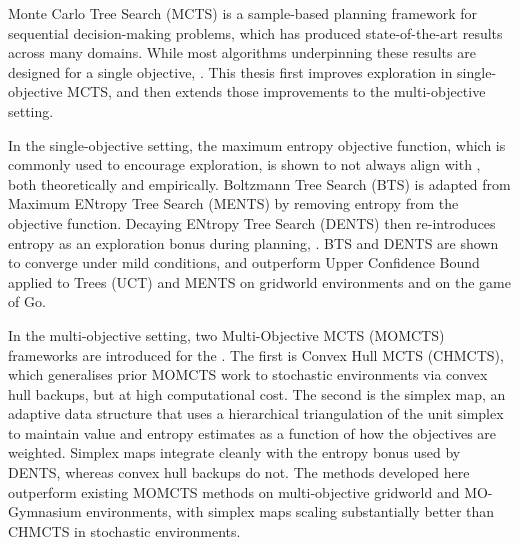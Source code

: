 Monte Carlo Tree Search (MCTS) is a sample-based planning framework for sequential decision-making problems, which has produced state-of-the-art results across many domains. While most algorithms underpinning these results are designed for a single objective, . This thesis first improves exploration in single-objective MCTS, and then extends those improvements to the multi-objective setting.

In the single-objective setting, the maximum entropy objective function, which is commonly used to encourage exploration, is shown to not always align with , both theoretically and empirically. Boltzmann Tree Search (BTS) is adapted from Maximum ENtropy Tree Search (MENTS) by removing entropy from the objective function. Decaying ENtropy Tree Search (DENTS) then re-introduces entropy as an exploration bonus during planning, . BTS and DENTS are shown to converge under mild conditions, and outperform Upper Confidence Bound applied to Trees (UCT) and MENTS on gridworld environments and on the game of Go.

In the multi-objective setting, two Multi-Objective MCTS (MOMCTS) frameworks are introduced for the . The first is Convex Hull MCTS (CHMCTS), which generalises prior MOMCTS work to stochastic environments via convex hull backups, but at high computational cost. The second is the simplex map, an adaptive data structure that uses a hierarchical triangulation of the unit simplex to maintain value and entropy estimates as a function of how the objectives are weighted. Simplex maps integrate cleanly with the entropy bonus used by DENTS, whereas convex hull backups do not. The methods developed here outperform existing MOMCTS methods on multi-objective gridworld and MO-Gymnasium environments, with simplex maps scaling substantially better than CHMCTS in stochastic environments.